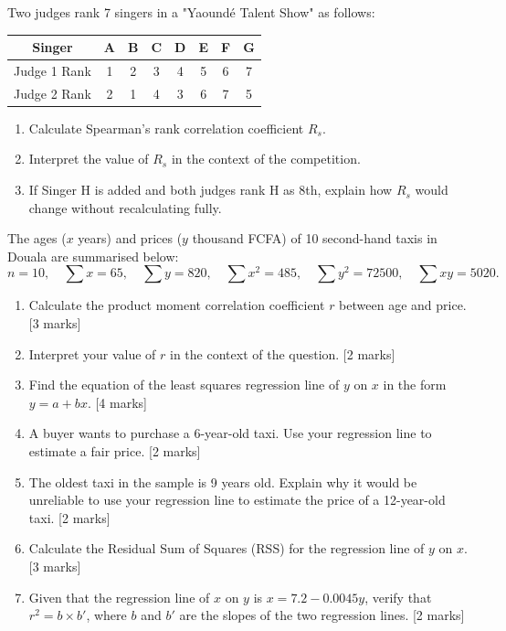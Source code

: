 \documentclass[11pt]{article}
\newcounter{popsec}
\newcounter{popsub}
\newcommand{\courssub}[1]{%
  \stepcounter{popsub}%
  \par\vspace{9pt}\noindent{\popxbold\fontsize{11.5}{13}\selectfont\color{popink}{\color{poporange}\thepopsec.\thepopsub}\hspace{6pt}#1}\par\nopagebreak\vspace{4pt}
}
\begin{document}
\begin{exercice}
Two judges rank 7 singers in a "Yaoundé Talent Show" as follows:

\begin{center}
\begin{tabular}{|c|c|c|c|c|c|c|c|}
\hline
Singer & A & B & C & D & E & F & G \\
\hline
Judge 1 Rank & 1 & 2 & 3 & 4 & 5 & 6 & 7 \\
\hline
Judge 2 Rank & 2 & 1 & 4 & 3 & 6 & 7 & 5 \\
\hline
\end{tabular}
\end{center}

\begin{enumerate}
    \item Calculate Spearman's rank correlation coefficient $R_s$.
    \item Interpret the value of $R_s$ in the context of the competition.
    \item If Singer H is added and both judges rank H as 8th, explain how $R_s$ would change without recalculating fully.
\end{enumerate}
\end{exercice}

\courssub{I prepare for the GCE}

\begin{exercice}
The ages ($x$ years) and prices ($y$ thousand FCFA) of 10 second-hand taxis in Douala are summarised below:
\[
n=10,\quad \sum x = 65,\quad \sum y = 820,\quad \sum x^2 = 485,\quad \sum y^2 = 72500,\quad \sum xy = 5020.
\]

\begin{enumerate}
    \item Calculate the product moment correlation coefficient $r$ between age and price. \hfill [3 marks]
    \item Interpret your value of $r$ in the context of the question. \hfill [2 marks]
    \item Find the equation of the least squares regression line of $y$ on $x$ in the form $y = a + bx$. \hfill [4 marks]
    \item A buyer wants to purchase a 6-year-old taxi. Use your regression line to estimate a fair price. \hfill [2 marks]
    \item The oldest taxi in the sample is 9 years old. Explain why it would be unreliable to use your regression line to estimate the price of a 12-year-old taxi. \hfill [2 marks]
    \item Calculate the Residual Sum of Squares (RSS) for the regression line of $y$ on $x$. \hfill [3 marks]
    \item Given that the regression line of $x$ on $y$ is $x = 7.2 - 0.0045y$, verify that $r^2 = b \times b'$, where $b$ and $b'$ are the slopes of the two regression lines. \hfill [2 marks]
\end{enumerate}
\end{exercice}
\end{document}

